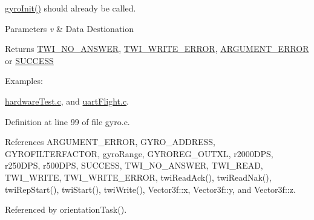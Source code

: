\hyperlink{group__gyro_ga276b9ab6ac85c65b5a55356c00958be7}{gyro\-Init()} should already be called. 
\begin{DoxyParams}{Parameters}
{\em v} & Data Destionation \\
\hline
\end{DoxyParams}
\begin{DoxyReturn}{Returns}
\hyperlink{group__error_gga2c3e4bb40f36b262a5214e2da2bca9c5a04d5943ba652af2205c88b247e0c659c}{T\-W\-I\-\_\-\-N\-O\-\_\-\-A\-N\-S\-W\-E\-R}, \hyperlink{group__error_gga2c3e4bb40f36b262a5214e2da2bca9c5ac0e3b3463dcaf220e54794b4711708c9}{T\-W\-I\-\_\-\-W\-R\-I\-T\-E\-\_\-\-E\-R\-R\-O\-R}, \hyperlink{group__error_gga2c3e4bb40f36b262a5214e2da2bca9c5a49ccf277a69dd938c591928aa27c66cc}{A\-R\-G\-U\-M\-E\-N\-T\-\_\-\-E\-R\-R\-O\-R} or \hyperlink{group__error_gga2c3e4bb40f36b262a5214e2da2bca9c5ac7f69f7c9e5aea9b8f54cf02870e2bf8}{S\-U\-C\-C\-E\-S\-S} 
\end{DoxyReturn}
\begin{Desc}
\item[Examples\-: ]\par
\hyperlink{hardware_test_8c-example}{hardware\-Test.\-c}, and \hyperlink{uart_flight_8c-example}{uart\-Flight.\-c}.\end{Desc}


Definition at line 99 of file gyro.\-c.



References A\-R\-G\-U\-M\-E\-N\-T\-\_\-\-E\-R\-R\-O\-R, G\-Y\-R\-O\-\_\-\-A\-D\-D\-R\-E\-S\-S, G\-Y\-R\-O\-F\-I\-L\-T\-E\-R\-F\-A\-C\-T\-O\-R, gyro\-Range, G\-Y\-R\-O\-R\-E\-G\-\_\-\-O\-U\-T\-X\-L, r2000\-D\-P\-S, r250\-D\-P\-S, r500\-D\-P\-S, S\-U\-C\-C\-E\-S\-S, T\-W\-I\-\_\-\-N\-O\-\_\-\-A\-N\-S\-W\-E\-R, T\-W\-I\-\_\-\-R\-E\-A\-D, T\-W\-I\-\_\-\-W\-R\-I\-T\-E, T\-W\-I\-\_\-\-W\-R\-I\-T\-E\-\_\-\-E\-R\-R\-O\-R, twi\-Read\-Ack(), twi\-Read\-Nak(), twi\-Rep\-Start(), twi\-Start(), twi\-Write(), Vector3f\-::x, Vector3f\-::y, and Vector3f\-::z.



Referenced by orientation\-Task().



